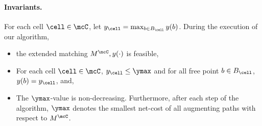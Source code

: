 \paragraph{Invariants.} For each cell $\cell \in \mcC$, let $y_\cell= \max_{b\in B_\cell}y(b)$. During the execution of our algorithm,
\begin{itemize}
    \item[(I1)] the extended matching $M^\mcC, y(\cdot)$ is feasible,
    \item[(I2)] For each cell $\cell \in \mcC$, $y_\cell \le \ymax$ and for all free point $b\in B_\cell$, $y(b)=y_{\cell}$, and,
   \item[(I3)] The $\ymax$-value is non-decreasing. Furthermore, after each step of the algorithm, $\ymax$ denotes the smallest net-cost of all augmenting paths with respect to $M^{\mcC}$.
\end{itemize}


